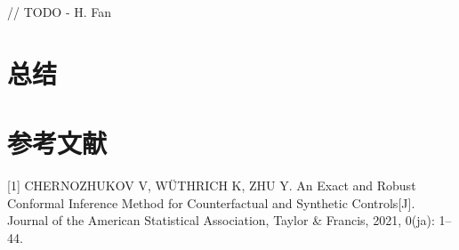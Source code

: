 \documentclass[]{ctexart}
\begin{document}
// TODO - H. Fan

\hypertarget{ux603bux7ed3}{%
\section{总结}\label{ux603bux7ed3}}

\hypertarget{ux53c2ux8003ux6587ux732e}{%
\section*{参考文献}\label{ux53c2ux8003ux6587ux732e}}

\hypertarget{refs}{}
\leavevmode\hypertarget{ref-doi:10.1080ux2f01621459.2021.1920957}{}%
{[}1{]} CHERNOZHUKOV V, WÜTHRICH K, ZHU Y. An Exact and Robust Conformal
Inference Method for Counterfactual and Synthetic Controls{[}J{]}.
Journal of the American Statistical Association, Taylor \& Francis,
2021, 0(ja): 1--44.
\end{document}
